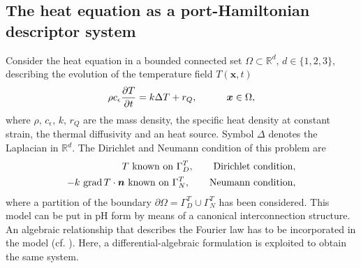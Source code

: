 \subsection{The heat equation as a port-Hamiltonian descriptor system}\label{sec:phheat}
Consider the heat equation in a bounded connected set $\Omega \subset \mathbb{R}^d, \, d \in \{1,2,3\}$, describing the evolution of the temperature field $T(\bm{x}, t)$
\begin{equation}\label{eq:heatEq}
\rho c_\epsilon \diffp{T}{t} = k \Delta T + r_Q, \qquad \quad \bm{x} \in \Omega,
\end{equation}
where $\rho,\, c_\epsilon,\, k,\, r_Q$ are the mass density, the specific heat density at constant strain, the thermal diffusivity and an heat source. Symbol $\Delta$ denotes the Laplacian in $\mathbb{R}^d$. The Dirichlet and Neumann condition of this problem are 
\begin{equation*}
	\begin{aligned}
	T \text{ known on } \Gamma_D^T, \qquad \text{Dirichlet condition}, \\
	-k \, \operatorname*{grad} T \cdot \bm{n} \text{ known on } \Gamma_N^T, \qquad \text{Neumann condition},
	\end{aligned}
\end{equation*}
where a partition of the boundary $\partial \Omega = \Gamma_D^T \cup \Gamma_N^T$ has been considered. This model can be put in pH form by means of a canonical interconnection structure. An algebraic relationship that describes the Fourier law has to be incorporated in the model (cf. \cite[Chapter 2]{kotyczka2019numerical}). Here, a differential-algebraic formulation is exploited to obtain the same system. \\

